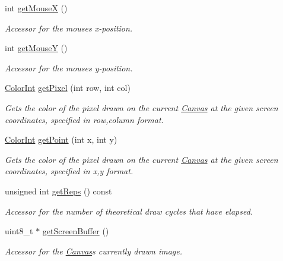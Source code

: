 \begin{DoxyCompactItemize}
int \hyperlink{classtsgl_1_1_canvas_a4af9bed83746f998474039185d2a765a}{get\+Mouse\+X} ()
\begin{DoxyCompactList}\small\item\em Accessor for the mouse\textquotesingle{}s x-\/position. \end{DoxyCompactList}\item 
int \hyperlink{classtsgl_1_1_canvas_a7fc8592848aaa14c3ff440d0ed3c9e4f}{get\+Mouse\+Y} ()
\begin{DoxyCompactList}\small\item\em Accessor for the mouse\textquotesingle{}s y-\/position. \end{DoxyCompactList}\item 
\hyperlink{structtsgl_1_1_color_int}{Color\+Int} \hyperlink{classtsgl_1_1_canvas_a1f54dba4b09d248e2611f3409353c2c6}{get\+Pixel} (int row, int col)
\begin{DoxyCompactList}\small\item\em Gets the color of the pixel drawn on the current \hyperlink{classtsgl_1_1_canvas}{Canvas} at the given screen coordinates, specified in row,column format. \end{DoxyCompactList}\item 
\hyperlink{structtsgl_1_1_color_int}{Color\+Int} \hyperlink{classtsgl_1_1_canvas_aa31883b3c9b09006cf82b270ad7a0a9f}{get\+Point} (int x, int y)
\begin{DoxyCompactList}\small\item\em Gets the color of the pixel drawn on the current \hyperlink{classtsgl_1_1_canvas}{Canvas} at the given screen coordinates, specified in x,y format. \end{DoxyCompactList}\item 
unsigned int \hyperlink{classtsgl_1_1_canvas_a8f0819f368b41b147f1a7f560a7af6a4}{get\+Reps} () const 
\begin{DoxyCompactList}\small\item\em Accessor for the number of theoretical draw cycles that have elapsed. \end{DoxyCompactList}\item 
uint8\+\_\+t $\ast$ \hyperlink{classtsgl_1_1_canvas_a71f072dd82ca3b5cecfd65cde6d8a226}{get\+Screen\+Buffer} ()
\begin{DoxyCompactList}\small\item\em Accessor for the \hyperlink{classtsgl_1_1_canvas}{Canvas}\textquotesingle{}s currently drawn image. \end{DoxyCompactList}\item 

\end{DoxyCompactItemize}
